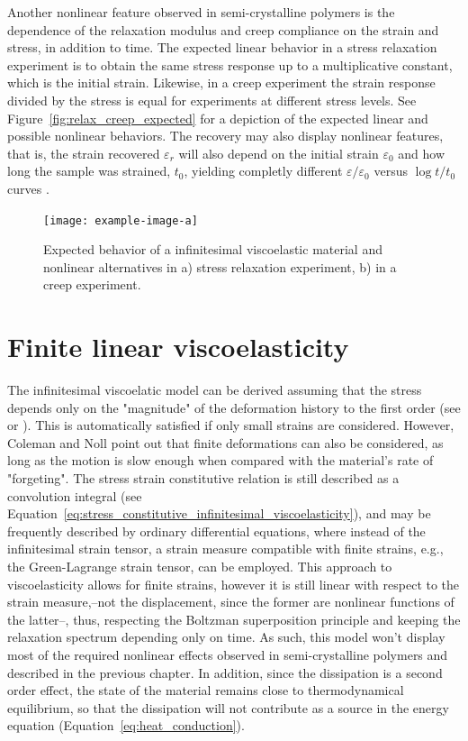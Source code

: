 Another nonlinear feature observed in semi-crystalline polymers is the dependence of the relaxation modulus and creep compliance on the strain and stress, in addition to time.
The expected linear behavior in a stress relaxation experiment is to obtain the same stress response up to a multiplicative constant, which is the initial strain.
Likewise, in a creep experiment the strain response divided by the stress is equal for experiments at different stress levels.
See Figure~\eqref{fig:relax_creep_expected} for a depiction of the expected linear and possible nonlinear behaviors.
The recovery may also display nonlinear features, that is, the strain recovered $\varepsilon_r$ will also depend on the initial strain $\varepsilon_0$ and how long the sample was strained, $t_0$, yielding completly different $\varepsilon/\varepsilon_0$ versus $\log t/t_0$ curves \citep{ferryViscoelasticPropertiesPolymers1980}.
\begin{figure}
  \texttt{[image: example-image-a]}
  \caption{Expected behavior of a infinitesimal viscoelastic material and nonlinear alternatives in a) stress relaxation experiment, b) in a creep experiment. }
\label{fig:relax_creep_expected}
\end{figure}


\section{Finite linear viscoelasticity}
The infinitesimal viscoelatic model can be derived assuming that the stress depends only on the "magnitude" of the deformation history to the first order (see \cite{colemanFoundationsLinearViscoelasticity1961} or \cite{christensen2013theory}).
This is automatically satisfied if only small strains are considered.
However, Coleman and Noll \citep{colemanFoundationsLinearViscoelasticity1961} point out that finite deformations can also be considered, as long as the motion is slow enough when compared with the material's rate of "forgeting".
The stress strain constitutive relation is still described as a convolution integral (see Equation~\eqref{eq:stress_constitutive_infinitesimal_viscoelasticity}), and may be frequently described by ordinary differential equations, where instead of the infinitesimal strain tensor, a strain measure compatible with finite strains, e.g., the Green-Lagrange strain tensor, can be employed.
This approach to viscoelasticity allows for finite strains, however it is still linear with respect to the strain measure,--not the displacement, since the former are nonlinear functions of the latter--, thus, respecting the Boltzman superposition principle and keeping the relaxation spectrum depending only on time.
As such, this model won't display most of the required nonlinear effects observed in semi-crystalline polymers and described in the previous chapter.
In addition, since the dissipation is a second order effect, the state of the material remains close to thermodynamical equilibrium, so that the dissipation will not contribute as a source in the energy equation (Equation~\eqref{eq:heat_conduction}).


